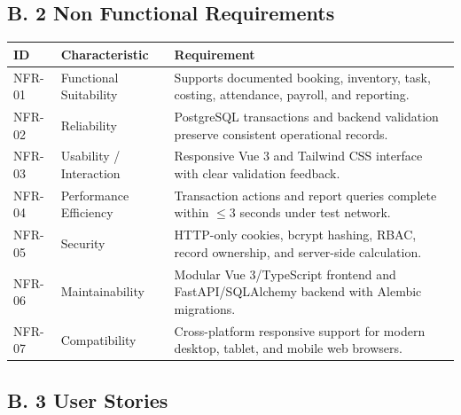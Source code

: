 \documentclass[12pt, letterpaper]{article}
\begin{document}
\newpage


 \subsection*{B. 2 Non Functional Requirements}


\begin{table}[h]
\centering
\small

\begin{tabular}{p{1.8cm} p{4.2cm} p{8cm}}
\toprule
\textbf{ID} & \textbf{Characteristic} & \textbf{Requirement}  \\
\midrule
NFR-01 & Functional Suitability & Supports documented booking, inventory, task, costing, attendance, payroll, and reporting. \\
NFR-02 & Reliability & PostgreSQL transactions and backend validation preserve consistent operational records. \\
NFR-03 & Usability / Interaction & Responsive Vue 3 and Tailwind CSS interface with clear validation feedback. \\
NFR-04 & Performance Efficiency & Transaction actions and report queries complete within $\le 3$ seconds under test network. \\
NFR-05 & Security & HTTP-only cookies, bcrypt hashing, RBAC, record ownership, and server-side calculation. \\
NFR-06 & Maintainability & Modular Vue 3/TypeScript frontend and FastAPI/SQLAlchemy backend with Alembic migrations. \\
NFR-07 & Compatibility & Cross-platform responsive support for modern desktop, tablet, and mobile web browsers. \\
\bottomrule
\end{tabular}
\end{table}


\clearpage

\subsection*{B. 3 User Stories}
\end{document}
